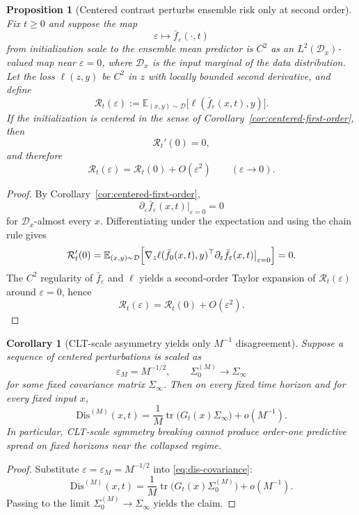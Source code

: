 \documentclass[11pt]{article}
\newcommand{\tr}{\operatorname{tr}}
\newtheorem{proposition}[theorem]{Proposition}
\newtheorem{corollary}[theorem]{Corollary}
\theoremstyle{remark}
\begin{document}
\begin{proposition}[Centered contrast perturbs ensemble risk only at second order]
\label{prop:risk-second-order}
Fix $t \ge 0$ and suppose the map
\[
\varepsilon \mapsto \bar f_\varepsilon(\cdot,t)
\]
from initialization scale to the ensemble mean predictor is $C^2$ as an $L^2(\mathcal D_x)$-valued map near $\varepsilon=0$, where $\mathcal D_x$ is the input marginal of the data distribution. Let the loss $\ell(z,y)$ be $C^2$ in $z$ with locally bounded second derivative, and define
\[
\mathcal R_t(\varepsilon)
:=
\mathbb E_{(x,y)\sim\mathcal D}\bigl[\ell(\bar f_\varepsilon(x,t),y)\bigr].
\]
If the initialization is centered in the sense of Corollary~\ref{cor:centered-first-order}, then
\[
\mathcal R_t'(0)=0,
\]
and therefore
\[
\mathcal R_t(\varepsilon)=\mathcal R_t(0)+O(\varepsilon^2)
\qquad
(\varepsilon \to 0).
\]
\end{proposition}

\begin{proof}
By Corollary~\ref{cor:centered-first-order},
\[
\partial_\varepsilon \bar f_\varepsilon(x,t)\big|_{\varepsilon=0}=0
\]
for $\mathcal D_x$-almost every $x$. Differentiating under the expectation and using the chain rule gives
\[
\mathcal R_t'(0)
=
\mathbb E_{(x,y)\sim\mathcal D}
\Bigl[
\nabla_z \ell(\bar f_0(x,t),y)^\top
\partial_\varepsilon \bar f_\varepsilon(x,t)\big|_{\varepsilon=0}
\Bigr]
=
0.
\]
The $C^2$ regularity of $\bar f_\varepsilon$ and $\ell$ yields a second-order Taylor expansion of $\mathcal R_t(\varepsilon)$ around $\varepsilon=0$, hence
\[
\mathcal R_t(\varepsilon)=\mathcal R_t(0)+O(\varepsilon^2).
\]
\end{proof}

\begin{corollary}[CLT-scale asymmetry yields only $M^{-1}$ disagreement]
\label{cor:clt-mminus1}
Suppose a sequence of centered perturbations is scaled as
\[
\varepsilon_M = M^{-1/2},
\qquad
\Sigma_0^{(M)} \to \Sigma_\infty
\]
for some fixed covariance matrix $\Sigma_\infty$. Then on every fixed time horizon and for every fixed input $x$,
\[
\mathrm{Dis}^{(M)}(x,t)
=
\frac{1}{M}\tr\!\bigl(G_t(x)\Sigma_\infty\bigr)
 + o(M^{-1}).
\]
In particular, CLT-scale symmetry breaking cannot produce order-one predictive spread on fixed horizons near the collapsed regime.
\end{corollary}

\begin{proof}
Substitute $\varepsilon=\varepsilon_M=M^{-1/2}$ into \eqref{eq:dis-covariance}:
\[
\mathrm{Dis}^{(M)}(x,t)
=
\frac{1}{M}\tr\!\bigl(G_t(x)\Sigma_0^{(M)}\bigr) + o(M^{-1}).
\]
Passing to the limit $\Sigma_0^{(M)} \to \Sigma_\infty$ yields the claim.
\end{proof}
\end{document}
